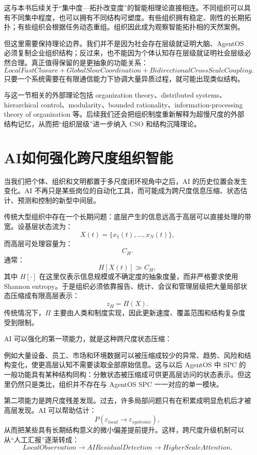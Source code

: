 这与本书后续关于“集中度—拓扑改变度”的智能相理论直接相连。不同组织可以具有不同集中程度，也可以拥有不同结构可塑度。有些组织拥有稳定、刚性的长期拓扑；有些组织会根据任务动态重组。组织因此成为观察智能拓扑相的天然案例。

但这里需要保持理论边界。我们并不是因为社会存在层级就证明大脑、AgentOS 必须复制企业组织结构；反过来，也不能因为个体认知存在层级就证明社会层级必然合理。真正值得保留的是更抽象的功能关系：
\[
\boxed{
LocalFastClosure
+
GlobalSlowCoordination
+
BidirectionalCrossScaleCoupling.
}
\]
只要一个系统需要在有限通信能力下协调大量异质过程，就可能出现类似结构。

与这一节相关的外部理论包括 organization theory、distributed systems、hierarchical control、modularity、bounded rationality、information-processing theory of organization 等。后续我们还会把组织制度重新解释为超慢尺度的外部结构记忆，从而把“组织层级”进一步纳入 CSO 和结构沉降理论。

\section{AI如何强化跨尺度组织智能}

当我们把个体、组织和文明都置于多尺度闭环视角中之后，AI 的历史位置会发生变化。AI 不再只是某些岗位的自动化工具，而可能成为跨尺度信息压缩、状态估计、预测和控制的新型中间层。

传统大型组织中存在一个长期问题：底层产生的信息远高于高层可以直接处理的带宽。设基层状态流为：
\[
X(t)
=
\{x_1(t),\ldots,x_N(t)\},
\]
而高层可处理容量为：
\[
C_H.
\]
通常：
\[
H[X(t)]
\gg
C_H,
\]
其中 $H[\cdot]$ 在这里仅表示信息规模或不确定度的抽象度量，而非严格要求使用 Shannon entropy。于是组织必须依靠报告、统计、会议和管理层级把大量局部状态压缩成有限高层表示：
\[
z_H
=
\Pi(X).
\]
传统情况下，$\Pi$ 主要由人类和制度实现，因此更新速度、覆盖范围和结构复杂度受到限制。

AI 可以强化的第一项能力，就是这种跨尺度状态压缩：
\begin{statementbox}
\centering
{}
\end{statementbox}
例如大量设备、员工、市场和环境数据可以被压缩成较少的异常、趋势、风险和结构变化，使更高层认知不需要读取全部原始信息。这与以后 AgentOS 中 SPC 的一般功能具有某种结构同构：分散状态被压缩成可供更高层访问的状态表示。但这里仍然只是类比，组织并不存在与 AgentOS SPC 一一对应的单一模块。

第二项能力是跨尺度残差发现。过去，许多局部问题只有在积累成明显危机后才被高层发现。AI 可以帮助估计：
\[
P
\left(
\varepsilon_{local}
\rightarrow
\varepsilon_{systemic}
\right),
\]
从而把某些具有长期结构意义的微小偏差提前提升。这样，跨尺度升级机制可以从“人工汇报”逐渐转成：
\[
LocalObservation
\rightarrow
AIResidualDetection
\rightarrow
HigherScaleAttention.
\]

